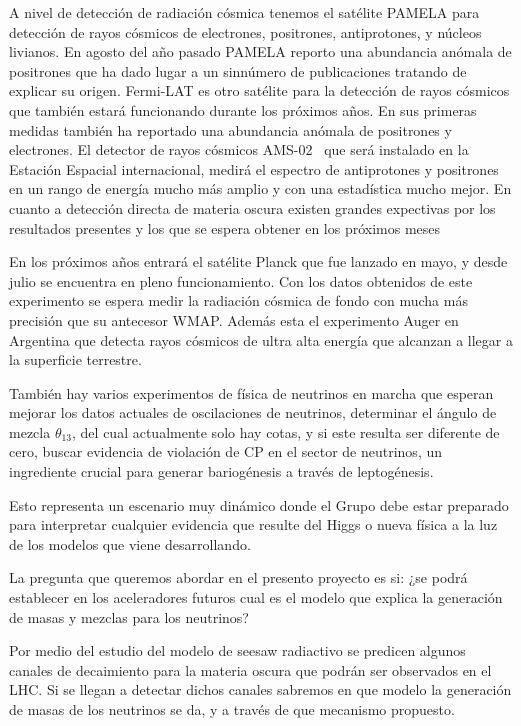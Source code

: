 \documentclass[11pt]{article}
\begin{document}
A nivel de detección de radiación cósmica tenemos el satélite PAMELA para detección de rayos cósmicos de electrones, positrones, antiprotones, y núcleos livianos. En agosto del año pasado PAMELA reporto una abundancia anómala de positrones %
que ha dado lugar a un sinnúmero de publicaciones tratando de explicar su origen.  Fermi-LAT es otro satélite para la detección de rayos cósmicos que también estará funcionando  durante los próximos años. En sus primeras medidas %
también ha reportado una abundancia anómala de positrones y electrones. El detector de rayos cósmicos AMS-02~%
que será instalado en la Estación Espacial  internacional, medirá el espectro de antiprotones y positrones en un rango de energía mucho más amplio y con una estadística mucho mejor. En cuanto a detección directa de materia oscura existen grandes expectivas por los resultados presentes y los que se espera obtener en los próximos meses %

En los próximos años entrará el satélite Planck que fue lanzado en mayo, y desde julio  se encuentra en pleno funcionamiento. Con los datos obtenidos de este experimento se espera medir la radiación cósmica de fondo con mucha más precisión que su antecesor WMAP. Además esta el experimento Auger en Argentina que detecta rayos cósmicos de ultra alta energía que alcanzan a llegar a la superficie terrestre.

También hay varios experimentos de física de neutrinos en marcha que esperan mejorar los datos actuales de oscilaciones de neutrinos, determinar el ángulo de mezcla $\theta_{13}$, del cual actualmente solo hay cotas, y si este resulta ser diferente de cero, buscar evidencia de violación de CP en el sector de neutrinos, un ingrediente crucial para generar bariogénesis a través de leptogénesis.

Esto representa un escenario muy dinámico donde el Grupo debe estar preparado para interpretar cualquier evidencia que resulte del Higgs o nueva física a la luz de los modelos que viene desarrollando.
	
La pregunta que queremos abordar en el presento proyecto es si:
¿se podrá establecer en los aceleradores futuros cual es el modelo que
explica la generación de masas y mezclas para los neutrinos?

Por medio del estudio del modelo de seesaw radiactivo se predicen algunos canales de decaimiento para la materia oscura que podrán ser observados en el LHC. Si se llegan a detectar dichos canales sabremos en que modelo la generación de masas de los neutrinos se da, y a través de que mecanismo propuesto.
\end{document}
